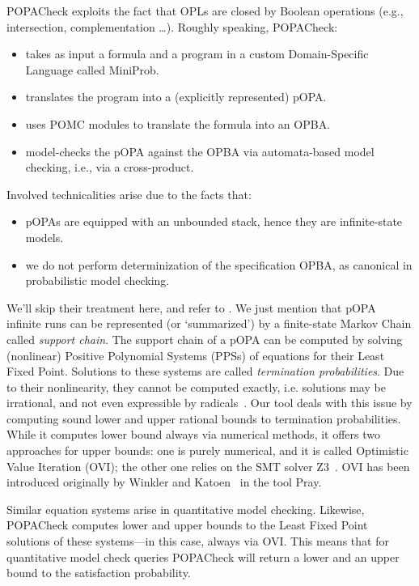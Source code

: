 \documentclass[9pt,a4paper]{article}
\begin{document}
POPACheck exploits the fact that OPLs are closed by Boolean operations (e.g., intersection, complementation \dots).
Roughly speaking, POPACheck:
\begin{itemize}
    \item takes as input a formula and a program in a custom Domain-Specific Language called MiniProb.
    \item translates the program into a (explicitly represented) pOPA.
    \item uses POMC modules to translate the formula into an OPBA.
    \item model-checks the pOPA against the OPBA via automata-based model checking, i.e., via a cross-product.
\end{itemize}
Involved technicalities arise due to the facts that:
\begin{itemize}
    \item pOPAs are equipped with an unbounded stack, hence they are infinite-state models.
    \item we do not perform determinization of the specification OPBA, as canonical in probabilistic model checking.
\end{itemize}
We'll skip their treatment here, and refer to \cite{abs-2404-03515}. We just mention that pOPA infinite runs can be represented (or `summarized') by a finite-state Markov Chain called \emph{support chain}. The support chain of a pOPA can be computed by solving (nonlinear) Positive Polynomial Systems (PPSs) of equations for their Least Fixed Point. Solutions to these systems are called \emph{termination probabilities}. Due to their nonlinearity, they cannot be computed exactly, i.e. solutions may be irrational, and not even expressible by radicals~\cite{EtessamiY09}. Our tool deals with this issue by computing sound lower and upper rational bounds to termination probabilities. While it computes lower bound always via numerical methods, it offers two approaches for upper bounds: one is purely numerical, and it is called Optimistic Value Iteration (OVI); the other one relies on the SMT solver Z3~\cite{z3}. OVI has been introduced originally by Winkler and Katoen~\cite{WinklerK23a} in the tool Pray.

Similar equation systems arise in quantitative model checking.
Likewise, POPACheck computes lower and upper bounds to the Least Fixed Point solutions of these systems---in this case, always via OVI.
This means that for quantitative model check queries POPACheck will return a lower and an upper bound to the satisfaction probability.
\end{document}
